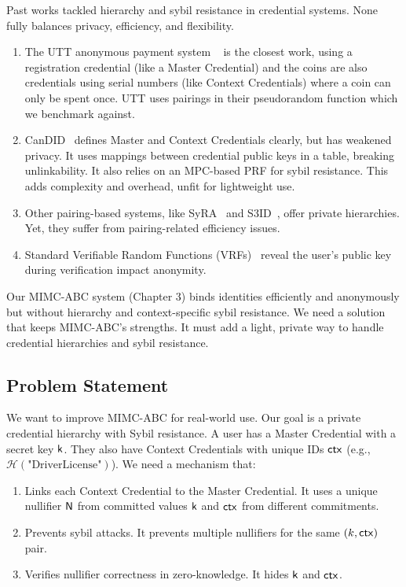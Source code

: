 Past works tackled hierarchy and sybil resistance in credential systems. None fully balances privacy, efficiency, and flexibility. 
\begin{enumerate}
    \item The UTT anonymous payment system ~\cite{tomescu2022utt} is the closest work, using a registration credential (like a Master Credential) and the coins are also credentials using serial numbers (like Context Credentials) where a coin can only be spent once. UTT uses pairings in their pseudorandom function which we benchmark against.

    \item CanDID~\cite{maram2021candid} defines Master and Context Credentials clearly, but has weakened privacy. It uses mappings between credential public keys in a table, breaking unlinkability. It also relies on an MPC-based PRF for sybil resistance. This adds complexity and overhead, unfit for lightweight use.

    \item Other pairing-based systems, like SyRA~\cite{crites_syra_2024} and S3ID~\cite{rabaninejad_attribute-based_2024}, offer private hierarchies. Yet, they suffer from pairing-related efficiency issues. 

    \item Standard Verifiable Random Functions  (VRFs)~\cite{hutchison_verifiable_2005} reveal the user’s public key during verification impact anonymity.

\end{enumerate}


Our MIMC-ABC system (Chapter 3) binds identities efficiently and anonymously but without hierarchy and context-specific sybil resistance. We need a solution that keeps MIMC-ABC’s strengths. It must add a light, private way to handle credential hierarchies and sybil resistance.


\subsection{Problem Statement}

We want to improve MIMC-ABC for real-world use. Our goal is a private credential hierarchy with Sybil resistance. A user has a Master Credential with a secret key $\mathsf{k}$. They also have Context Credentials with unique IDs $\mathsf{ctx}$ (e.g., $\mathcal{H}(\text{"DriverLicense"})$). We need a mechanism that:
\begin{enumerate}
    \item Links each Context Credential to the Master Credential. It uses a unique nullifier $\mathsf{N}$ from committed values $\mathsf{k}$ and $\mathsf{ctx}$ from different commitments.
    \item Prevents sybil attacks. It prevents multiple nullifiers for the same $(k, \mathsf{ctx})$ pair.
    \item Verifies nullifier correctness in zero-knowledge. It hides $\mathsf{k}$ and $\mathsf{ctx}$.
\end{enumerate}


